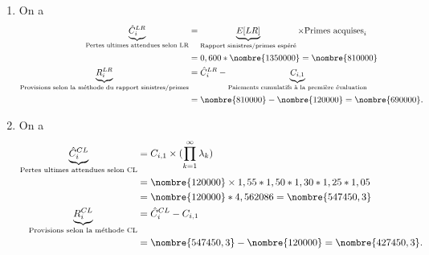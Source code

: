 \begin{exercice}
\begin{sol}
    \begin{enumerate}
    \item On a
      \begin{align*}
        \underbrace{\hat{C}_{i}^{LR}}_{\text{Pertes ultimes attendues selon LR}} &=
                                                                                   \underbrace{\Esp{LR}}_{\text{Rapport sinistres/primes espéré}} \times \text{Primes acquises}_i\\
                                                                                 &= 0,600 * \nombre{1350000} = \nombre{810000} \\
        \underbrace{R_i^{LR}}_{\text{Provisions selon la méthode du rapport sinistres/primes}}
                                                                                 &= \hat{C}_{i}^{LR} - \underbrace{C_{i, 1}}_{\text{Paiements cumulatifs à la première évaluation}} \\
                                                                                 &= \nombre{810000} - \nombre{120000} = \nombre{690000}.
      \end{align*}

    \item On a
      \begin{align*}
        \underbrace{\hat{C}_{i}^{CL}}_{\text{Pertes ultimes attendues selon CL}} &=
                                                                                   C_{i, 1} \times (\prod_{k=1}^{\infty} \lambda_k)\\
                                                                                 &= \nombre{120000} \times  1,55 * 1,50 * 1,30 * 1,25 * 1,05 \\
                                                                                 &=
                                                                                   \nombre{120000}
                                                                                   *
                                                                                   4,562086
                                                                                   =
                                                                                   \nombre{547450,3}
        \\
        \underbrace{R_i^{CL}}_{\text{Provisions selon la méthode CL}}
                                                                                 &= \hat{C}_{i}^{CL} - C_{i, 1} \\
                                                                                 &= \nombre{547450,3} - \nombre{120000} = \nombre{427450,3}.
      \end{align*}


\end{enumerate}
\end{sol}
\end{exercice}
